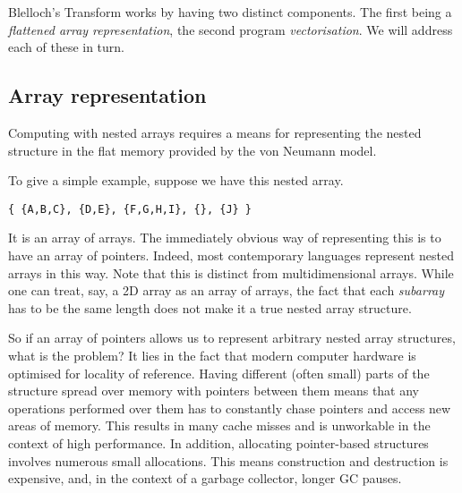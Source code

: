 
Blelloch's Transform works by having two distinct components. The first being a \emph{flattened array representation}, the second program \emph{vectorisation}. We will address each of these in turn.

\subsection{Array representation}
\label{sec:background-representation}

Computing with nested arrays requires a means for representing the nested structure in the flat memory provided by the von Neumann model.

To give a simple example, suppose we have this nested array.
%
\begin{lstlisting}
{ {A,B,C}, {D,E}, {F,G,H,I}, {}, {J} }
\end{lstlisting}
%
It is an array of arrays. The immediately obvious way of representing this is to have an array of pointers. Indeed, most contemporary languages represent nested arrays in this way. Note that this is distinct from multidimensional arrays. While one can treat, say, a 2D array as an array of arrays, the fact that each \emph{subarray} has to be the same length does not make it a true nested array structure.

So if an array of pointers allows us to represent arbitrary nested array structures, what is the problem? It lies in the fact that modern computer hardware is optimised for locality of reference. Having different (often small) parts of the structure spread over memory with pointers between them means that any operations performed over them has to constantly chase pointers and access new areas of memory. This results in many cache misses and is unworkable in the context of high performance. In addition, allocating pointer-based structures involves numerous small allocations. This means construction and destruction is expensive, and, in the context of a garbage collector, longer GC pauses.

